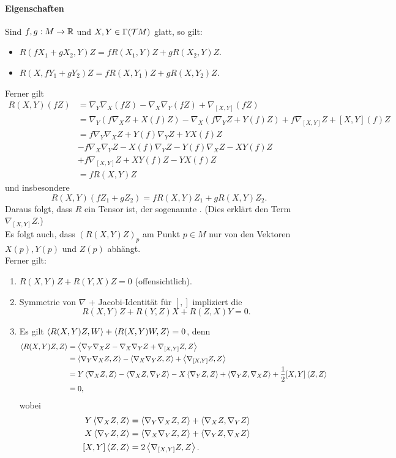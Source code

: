\paragraph{Eigenschaften}
Sind $f,g : M \overset{}{\rightarrow} \mathbb{R}$ und $X,Y \in \Gamma(\mathcal{T} M)$ glatt, so gilt:
\begin{itemize}
	\item $R(fX_1+gX_2,Y)Z = fR(X_1,Y)Z + gR(X_2,Y)Z$.
	\item $R(X, fY_1 + gY_2)Z = fR(X,Y_1)Z + gR(X,Y_2)Z$.
\end{itemize}
Ferner gilt
\begin{align*}
R(X,Y)(fZ) &= \nabla_Y \nabla_{X} (fZ) - \nabla_{X} \nabla_{Y} (fZ) + \nabla_{[X,Y]} (fZ)\\
&= \nabla_{Y}( f\nabla_{X} Z + X(f)Z) - \nabla_{X}(f\nabla_{Y} Z + Y(f)Z) + f\nabla_{[X,Y]} Z + [X,Y](f) Z\\
&=f \nabla_{Y} \nabla_{X} Z + Y(f) \nabla_{Y} Z + YX(f) Z\\
&- f\nabla_{X} \nabla_{Y} Z - X(f) \nabla_{Y} Z - Y(f) \nabla_{X} Z - XY(f)Z \\
&+ f\nabla_{[X,Y]} Z + XY(f) Z -YX(f)Z\\
&= f R(X,Y)Z
\end{align*}
und insbesondere
\[ R(X,Y)(fZ_1 + gZ_2) = f R(X,Y) Z_1 + g R(X,Y)Z_2.  \]
Daraus folgt, dass $R$ ein Tensor ist, der sogenannte . (Dies erklärt den Term $\nabla_{[X,Y]}Z$.)\\
Es folgt auch, dass $(R(X,Y)Z)_p$ am Punkt $p \in M$ nur von den Vektoren $X(p), Y(p)$ und $Z(p)$ abhängt.\\
Ferner gilt:
\begin{enumerate}[1)]
	\item $R(X,Y)Z + R(Y,X) Z = 0$ (offensichtlich).
	\item Symmetrie von $\nabla$ + Jacobi-Identität für $[,]$ impliziert die 
	\[ R(X,Y)Z + R(Y,Z)X  + R(Z,X)Y = 0. \]
	\item Es gilt $\left<R(X,Y)Z, W\right> + \left<R(X,Y)W, Z\right> = 0 $, denn
	\begin{align*}
	\left<R(X,Y)Z,Z\right> &= \left< \nabla_{Y} \nabla_{X} Z - \nabla_{X} \nabla_{Y} Z + \nabla_{[X,Y]} Z, Z \right>\\
	&= \left<\nabla_{Y} \nabla_{X} Z, Z\right>  - \left<\nabla_{X} \nabla_{Y}Z, Z \right> + \left<\nabla_{[X,Y]} Z, Z\right>\\
	&= Y\left<\nabla_{X} Z, Z\right>
	- \left<\nabla_{X} Z, \nabla_{Y} Z\right>
	- X\left<\nabla_{Y} Z, Z \right>
	+ \left<\nabla_Y Z, \nabla_{X} Z\right>
	+ \frac{1}{2} [X,Y] \left<Z,Z\right>\\
	&= 0,
	\end{align*}
	wobei
	\begin{align*}
	Y\left<\nabla_XZ,Z\right> &= \left< \nabla_{Y} \nabla_{X} Z, Z \right> + \left<\nabla_{X} Z, \nabla_{Y} Z\right>\\
	X\left<\nabla_YZ,Z\right> &= \left< \nabla_{X} \nabla_{Y} Z, Z \right> + \left<\nabla_{Y} Z, \nabla_{X} Z\right>\\
	[X,Y] \left<Z,Z\right> &= 2 \left< \nabla_{[X,Y]} Z,Z \right>.
	\end{align*}
\end{enumerate}
